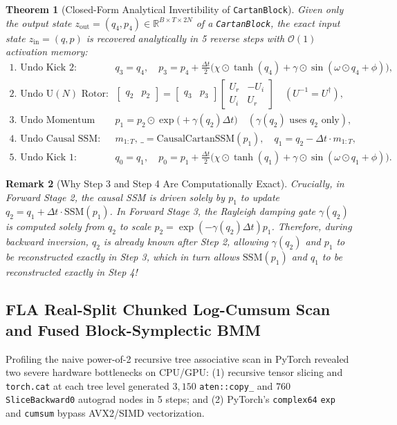 \documentclass[11pt,a4paper]{article}
\newtheorem{theorem}{Theorem}[section]
\newtheorem{remark}[theorem]{Remark}
\begin{document}
\begin{theorem}[Closed-Form Analytical Invertibility of \texttt{CartanBlock}]
\label{thm:exact_inverse}
Given only the output state $z_{\text{out}} = (q_4, p_4) \in \mathbb{R}^{B\times T\times 2N}$ of a \texttt{CartanBlock}, the exact input state $z_{\text{in}} = (q, p)$ is recovered analytically in 5 reverse steps with $\mathcal{O}(1)$ activation memory:
\begin{align}
    \text{1. Undo Kick 2:} \quad & q_3 = q_4, \quad p_3 = p_4 + \frac{\Delta t}{2}\big(\chi \odot \tanh(q_4) + \gamma \odot \sin(\omega \odot q_4 + \phi)\big), \\
    \text{2. Undo } \mathrm{U}(N)\text{ Rotor:} \quad & \begin{bmatrix} q_2 & p_2 \end{bmatrix} = \begin{bmatrix} q_3 & p_3 \end{bmatrix} \begin{bmatrix} U_r & -U_i \\ U_i & U_r \end{bmatrix} \quad (U^{-1} = U^\dagger), \\
    \text{3. Undo Momentum Damping:} \quad & p_1 = p_2 \odot \exp\big(+\gamma(q_2)\Delta t\big) \quad (\gamma(q_2)\text{ uses } q_2\text{ only}), \\
    \text{4. Undo Causal SSM:} \quad & m_{1:T},\, \_ = \mathrm{CausalCartanSSM}(p_1), \quad q_1 = q_2 - \Delta t \cdot m_{1:T}, \\
    \text{5. Undo Kick 1:} \quad & q_0 = q_1, \quad p_0 = p_1 + \frac{\Delta t}{2}\big(\chi \odot \tanh(q_1) + \gamma \odot \sin(\omega \odot q_1 + \phi)\big).
\end{align}
\end{theorem}

\begin{remark}[Why Step 3 and Step 4 Are Computationally Exact]
Crucially, in Forward Stage 2, the causal SSM is driven solely by $p_1$ to update $q_2 = q_1 + \Delta t\cdot\mathrm{SSM}(p_1)$. In Forward Stage 3, the Rayleigh damping gate $\gamma(q_2)$ is computed solely from $q_2$ to scale $p_2 = \exp(-\gamma(q_2)\Delta t)p_1$. Therefore, during backward inversion, $q_2$ is already known after Step 2, allowing $\gamma(q_2)$ and $p_1$ to be reconstructed exactly in Step 3, which in turn allows $\mathrm{SSM}(p_1)$ and $q_1$ to be reconstructed exactly in Step 4!
\end{remark}

\subsection{FLA Real-Split Chunked Log-Cumsum Scan and Fused Block-Symplectic BMM}
Profiling the naive power-of-2 recursive tree associative scan in PyTorch revealed two severe hardware bottlenecks on CPU/GPU: (1) recursive tensor slicing and \texttt{torch.cat} at each tree level generated $3,150$ \texttt{aten::copy\_} and $760$ \texttt{SliceBackward0} autograd nodes in 5 steps; and (2) PyTorch's \texttt{complex64} \texttt{exp} and \texttt{cumsum} bypass AVX2/SIMD vectorization.
\end{document}
